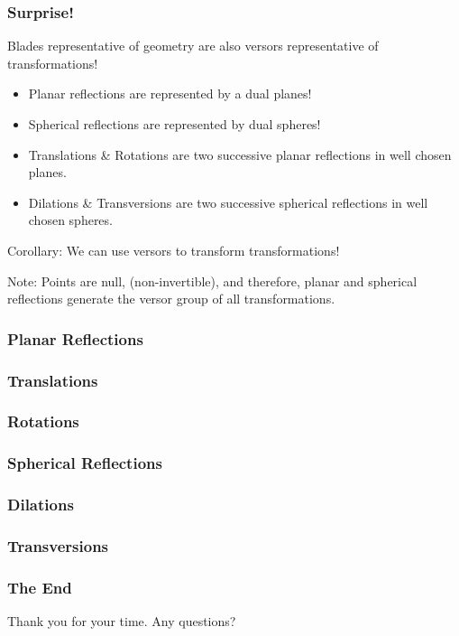 \documentclass{beamer}
\begin{document}
\begin{frame}
\frametitle{Surprise!}
\alert{Blades} representative of geometry are also \alert{versors} representative of transformations!\pause
\begin{itemize}
\item \alert{Planar reflections} are represented by a dual planes!\pause
\item \alert{Spherical reflections} are represented by dual spheres!\pause
\item \alert{Translations} \& \alert{Rotations} are two successive planar reflections in well chosen planes.\pause
\item \alert{Dilations} \& \alert{Transversions} are two successive spherical reflections in well chosen spheres.\pause
\end{itemize}
\alert{Corollary}: We can use versors to transform transformations!\pause

\alert{Note}: Points are null, (non-invertible), and therefore, planar and spherical reflections \alert{generate} the versor group of all transformations.
\end{frame}

\begin{frame}
\frametitle{Planar Reflections}
\end{frame}

\begin{frame}
\frametitle{Translations}
\end{frame}

\begin{frame}
\frametitle{Rotations}
\end{frame}

\begin{frame}
\frametitle{Spherical Reflections}
\end{frame}

\begin{frame}
\frametitle{Dilations}
\end{frame}

\begin{frame}
\frametitle{Transversions}
\end{frame}

\begin{frame}
\frametitle{The End}
Thank you for your time.
Any questions?
\end{frame}



\end{document}
